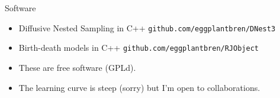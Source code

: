 \begin{frame}[t]{Software}
\begin{itemize}
\setlength{\itemsep}{20pt}
\item Diffusive Nested Sampling in C++
{\tt github.com/eggplantbren/DNest3}
\item Birth-death models in C++
{\tt github.com/eggplantbren/RJObject}
\item These are free software (GPLd).
\item The learning curve is steep (sorry) but I'm open to collaborations.
\end{itemize}
\end{frame}


